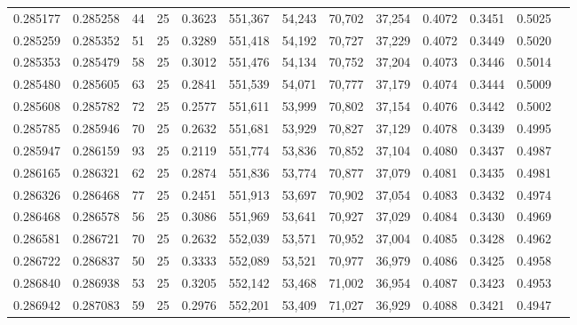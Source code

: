 \begin{tabular}{rrrrrrrrrrrrr}
0.285177 & 0.285258 &    44 &  25 &                                     0.3623 & 551,367 &  54,243 &  70,702 &  37,254 & 0.4072 & 0.3451 & 0.5025 \\
0.285259 & 0.285352 &    51 &  25 &                                     0.3289 & 551,418 &  54,192 &  70,727 &  37,229 & 0.4072 & 0.3449 & 0.5020 \\
0.285353 & 0.285479 &    58 &  25 &                                     0.3012 & 551,476 &  54,134 &  70,752 &  37,204 & 0.4073 & 0.3446 & 0.5014 \\
0.285480 & 0.285605 &    63 &  25 &                                     0.2841 & 551,539 &  54,071 &  70,777 &  37,179 & 0.4074 & 0.3444 & 0.5009 \\
0.285608 & 0.285782 &    72 &  25 &                                     0.2577 & 551,611 &  53,999 &  70,802 &  37,154 & 0.4076 & 0.3442 & 0.5002 \\
0.285785 & 0.285946 &    70 &  25 &                                     0.2632 & 551,681 &  53,929 &  70,827 &  37,129 & 0.4078 & 0.3439 & 0.4995 \\
0.285947 & 0.286159 &    93 &  25 &                                     0.2119 & 551,774 &  53,836 &  70,852 &  37,104 & 0.4080 & 0.3437 & 0.4987 \\
0.286165 & 0.286321 &    62 &  25 &                                     0.2874 & 551,836 &  53,774 &  70,877 &  37,079 & 0.4081 & 0.3435 & 0.4981 \\
0.286326 & 0.286468 &    77 &  25 &                                     0.2451 & 551,913 &  53,697 &  70,902 &  37,054 & 0.4083 & 0.3432 & 0.4974 \\
0.286468 & 0.286578 &    56 &  25 &                                     0.3086 & 551,969 &  53,641 &  70,927 &  37,029 & 0.4084 & 0.3430 & 0.4969 \\
0.286581 & 0.286721 &    70 &  25 &                                     0.2632 & 552,039 &  53,571 &  70,952 &  37,004 & 0.4085 & 0.3428 & 0.4962 \\
0.286722 & 0.286837 &    50 &  25 &                                     0.3333 & 552,089 &  53,521 &  70,977 &  36,979 & 0.4086 & 0.3425 & 0.4958 \\
0.286840 & 0.286938 &    53 &  25 &                                     0.3205 & 552,142 &  53,468 &  71,002 &  36,954 & 0.4087 & 0.3423 & 0.4953 \\
0.286942 & 0.287083 &    59 &  25 &                                     0.2976 & 552,201 &  53,409 &  71,027 &  36,929 & 0.4088 & 0.3421 & 0.4947 \\

\end{tabular}
